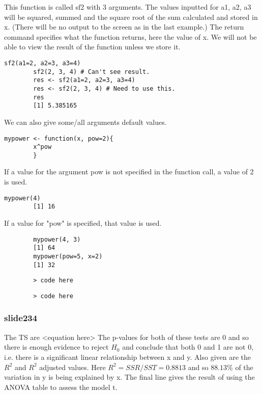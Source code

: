 \documentclass[a4paper,12pt]{article}
\begin{document}
\begin{itemize}
		This function is called sf2 with 3 arguments. The values inputted for a1, a2, a3 will be squared, summed and the square root of the sum calculated and stored in x. (There will be no output to the screen as in the last example.)
		The return command specifies what the function returns, here the value of x. We will not be able to view the result of the function unless we store it.
		\begin{verbatim}sf2(a1=2, a2=3, a3=4)
		sf2(2, 3, 4) # Can't see result.
		res <- sf2(a1=2, a2=3, a3=4)
		res <- sf2(2, 3, 4) # Need to use this.
		res
		[1] 5.385165
		\end{verbatim}
		We can also give some/all arguments default values.
		\begin{verbatim}mypower <- function(x, pow=2){
		x^pow
		}
		\end{verbatim}
		If a value for the argument pow is not specified in the function call,
		a value of 2 is used.
		\begin{verbatim}mypower(4)
		[1] 16
		\end{verbatim}
		If a value for "pow" is specified, that value is used.
		\begin{verbatim}
		mypower(4, 3)
		[1] 64
		mypower(pow=5, x=2)
		[1] 32
		\end{verbatim}
		
		
		
		
		
		
		
		
		
		
		\large \begin{verbatim}
		> code here
		\end{verbatim}\large
		
		
		\large \begin{verbatim}
		> code here
		\end{verbatim}\large
		
		
		
		\subsubsection{slide234}
		The TS are <equation here>  
		The p-values for both of these tests are 0 and so there is enough evidence to reject $H_0$ and conclude that both 0 and 1 are not 0, i.e. there is a significant linear relationship between x and y. 
		Also given are the $R^2$ and $R^2$ adjusted values. Here $R^2 = SSR/SST = 0.8813$ and so $88.13\%$ of the variation in y is being explained by x. 
		The final line gives the result of using the ANOVA table to assess the model t.
		

\end{itemize}
\end{document}
